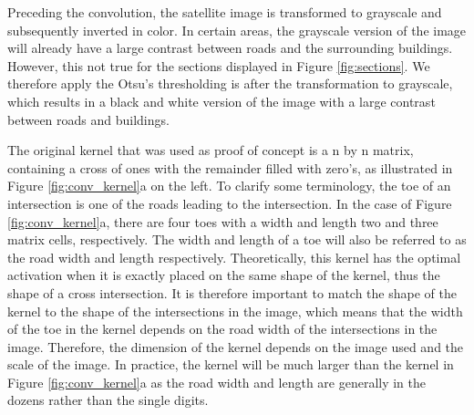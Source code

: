 Preceding the convolution, the satellite image is transformed to grayscale and subsequently inverted in color. In certain areas, the grayscale version of the image will already have a large contrast between roads and the surrounding buildings. However, this not true for the sections displayed in Figure \ref{fig:sections}. We therefore apply the Otsu's thresholding is after the transformation to grayscale, which results in a black and white version of the image with a large contrast between roads and buildings. 

The original kernel that was used as proof of concept is a n by n matrix, containing a cross of ones
with the remainder filled with zero's, as illustrated in Figure \ref{fig:conv_kernel}a on the left. To clarify some terminology, the toe of an intersection is one of the roads leading to the
intersection. In the case of Figure \ref{fig:conv_kernel}a, there are four toes
with a width and length two and three matrix cells, respectively. The width and length of a toe will also be referred to as the road width and length respectively. Theoretically, this kernel has the optimal activation when it is exactly placed on the same shape of the kernel, thus the shape of a cross intersection. It is therefore important to match the shape of the kernel to the shape of the intersections in the image, which means that the width of the toe in the kernel depends on the road width of the intersections in the image. Therefore, the dimension of the kernel depends on the image used and the scale of the image. In practice, the kernel will be much larger than the kernel in Figure \ref{fig:conv_kernel}a as the road width and length are generally in the dozens rather than the single digits.

